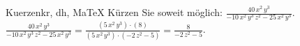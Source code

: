 \begin{MAufgabe}{Kuerzen}{kr, dh, MaTeX}
K\"urzen Sie soweit m\"oglich: $\frac{40\, x^2\, y^3}{ - 10\, x^2\, y^3\, z^2 - 25\, x^2\, y^3}$.\\ 
\ifLsg\MLoesung
\quad $\frac{40\, x^2\, y^3}{ - 10\, x^2\, y^3\, z^2 - 25\, x^2\, y^3}=\frac{(5\, x^2\, y^3)\cdot(8)}{(5\, x^2\, y^3)\cdot( - 2\, z^2 - 5)}=\frac{8}{ - 2\, z^2 - 5}$.\else\relax\fi
 \end{MAufgabe}